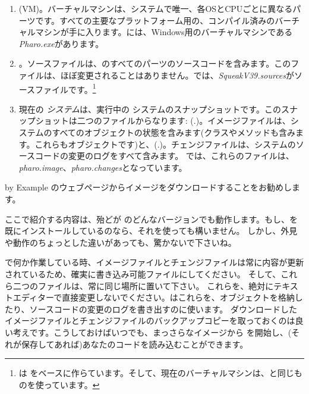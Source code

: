 \documentclass[a4paper,10pt,twoside]{book}
\begin{document}
\begin{enumerate}

  \item {} (VM)。バーチャルマシンは、システムで唯一、各OSとCPUごとに異なるパーツです。すべての主要なプラットフォーム用の、コンパイル済みのバーチャルマシンが手に入ります。には、Windows用のバーチャルマシンである\textit{Pharo.exe}があります。

  \item {}。ソースファイルは、\pharo のすべてのパーツのソースコードを含みます。このファイルは、ほぼ変更されることはありません。では、\emph{SqueakV39.sources}がソースファイルです。\footnote{\pharo は  をベースに作らています。そして、現在のバーチャルマシンは、\squeak と同じものを使っています。}

  \item 現在の \emph{システム}は、実行中の \pharo システムのスナップショットです。このスナップショットは二つのファイルからなります: (.)。イメージファイルは、システムのすべてのオブジェクトの状態を含みます(クラスやメソッドも含みます。これらもオブジェクトです)と、(.)。チェンジファイルは、システムのソースコードの変更のログをすべて含みます。
では、これらのファイルは、 \emph{pharo.image}、\emph{pharo.changes}となっています。
\end{enumerate}

\pharo by Example のウェブページからイメージをダウンロードすることをお勧めします。

ここで紹介する内容は、殆どが \pharo のどんなバージョンでも動作します。もし、\pharo を既にインストールしているのなら、それを使っても構いません。
しかし、外見や動作のちょっとした違いがあっても、驚かないで下さいね。

\pharo で何か作業している時、イメージファイルとチェンジファイルは常に内容が更新されているため、確実に書き込み可能ファイルにしてください。
そして、これら二つのファイルは、常に同じ場所に置いて下さい。
これらを、絶対にテキストエディターで直接変更しないでください。\pharo はこれらを、オブジェクトを格納したり、ソースコードの変更のログを書き出すのに使います。
ダウンロードしたイメージファイルとチェンジファイルのバックアップコピーを取っておくのは良い考えです。こうしておけばいつでも、まっさらなイメージから \pharo を開始し、(それが保存してあれば)あなたのコードを読み込むことができます。
\end{document}
